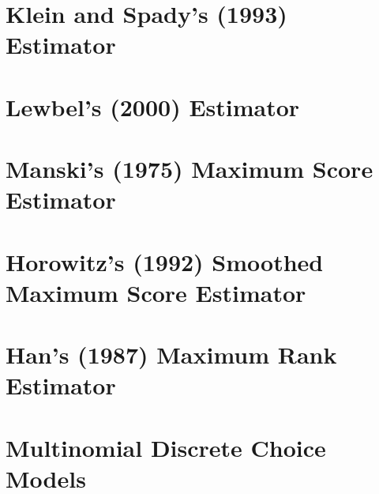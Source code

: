 \documentclass[xcolor=svgnames,dvipdfmx,cjk]{beamer}
\theoremstyle{example}
\begin{document}
  
  
  
  
  
  
  
  
  
  
  
  
  
  
  \section{Klein and Spady's (1993) Estimator}
  
  
  
  
  
  
  
  
  
  \section{Lewbel's (2000) Estimator}
  
  
  
  
  
  
  
  
  
  
  \section{Manski's (1975) Maximum Score Estimator}
  
  
  
  
  
  
  
  
  
  \section{Horowitz's (1992) Smoothed Maximum Score Estimator}
  
  
  
  
  
  
  
  
  
  
  
  \section{Han's (1987) Maximum Rank Estimator}
  
  
  
  
  
  
  
  
  
  
  \section{Multinomial Discrete Choice Models}
  
\end{document}

